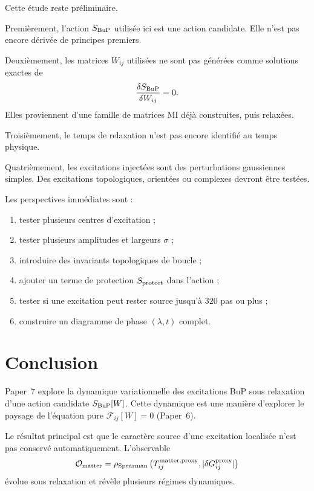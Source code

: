 \documentclass[11pt,a4paper]{article}
\begin{document}
Cette étude reste préliminaire.

Premièrement, l'action \(S_{\rm BuP}\) utilisée ici est une action candidate.
Elle n'est pas encore dérivée de principes premiers.

Deuxièmement, les matrices \(W_{ij}\) utilisées ne sont pas générées comme
solutions exactes de
\[
\frac{\delta S_{\rm BuP}}{\delta W_{ij}}=0.
\]
Elles proviennent d'une famille de matrices MI déjà construites, puis relaxées.

Troisièmement, le temps de relaxation n'est pas encore identifié au temps
physique.

Quatrièmement, les excitations injectées sont des perturbations gaussiennes
simples. Des excitations topologiques, orientées ou complexes devront être
testées.

Les perspectives immédiates sont :

\begin{enumerate}
  \item tester plusieurs centres d'excitation ;
  \item tester plusieurs amplitudes et largeurs \(\sigma\) ;
  \item introduire des invariants topologiques de boucle ;
  \item ajouter un terme de protection \(S_{\rm protect}\) dans l'action ;
  \item tester si une excitation peut rester source jusqu'à \(320\) pas ou plus ;
  \item construire un diagramme de phase \((\lambda,t)\) complet.
\end{enumerate}

\section{Conclusion}

Paper~7 explore la dynamique variationnelle des excitations BuP sous relaxation
d'une action candidate \(S_{\rm BuP}[W]\). Cette dynamique est une manière
d’explorer le paysage de l’équation pure \(\mathcal{F}_{ij}[W]=0\) (Paper~6).

Le résultat principal est que le caractère source d'une excitation
localisée n'est pas conservé automatiquement. L'observable
\[
\mathcal{O}_{\rm matter}
=
\rho_{\rm Spearman}
\left(
T_{ij}^{\rm matter,proxy},
|\delta G_{ij}^{\rm proxy}|
\right)
\]
évolue sous relaxation et révèle plusieurs régimes dynamiques.
\end{document}
